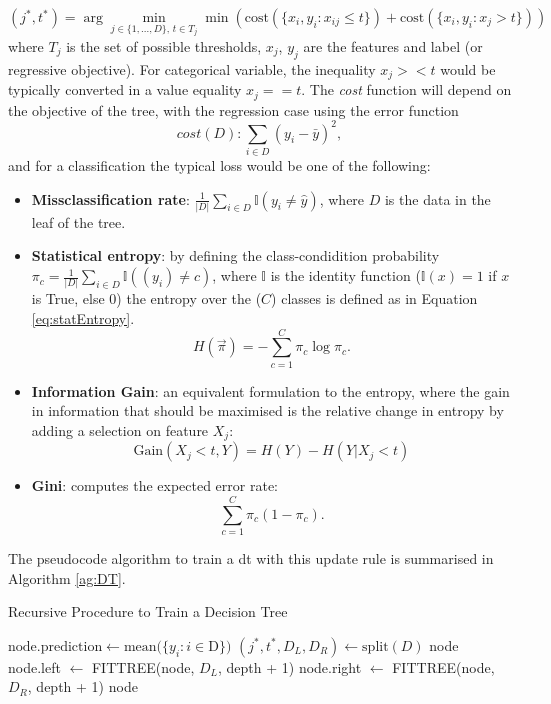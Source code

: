 \begin{equation}\label{eq:DTcost}
    (j^*, t^*) = \arg\min_{j\in \{1, ..., D\},\, t \in T_j} \min \left(\text{cost} (\{x_i, y_i : x_{ij} \leq t\}) + \text{cost}(\{x_i, y_i : x_j > t\}) \right)
\end{equation}
where $T_j$ is the set of possible thresholds, $x_j$, $y_j$ are the features and label (or regressive objective). For categorical variable, the inequality $x_j >< t$ would be typically converted in a value equality $x_j == t$. The \textit{cost} function will depend on the objective of the tree, with the regression case using the error function \[cost(D) : \sum_{i\in D}(y_i - \bar{y})^2,\] and for a classification the typical loss would be one of the following:
\begin{itemize}
    \item \textbf{Missclassification rate}: $\frac{1}{|D|} \sum_{i \in D} \mathbb{I}(y_i \neq \hat{y})$, where $D$ is the data in the leaf of the tree. 
    \item \textbf{Statistical entropy}: by defining the class-condidition probability $\pi_c = \frac{1}{|D|} \sum_{i \in D} \mathbb{I}((y_i) \neq c)$, where $\mathbb{I}$ is the identity function ($\mathbb{I}(x) = 1$ if $x$ is True, else $0$) the entropy over the ($C$) classes is defined as in Equation \ref{eq:statEntropy}. 
    \begin{equation}\label{eq:statEntropy}
        H(\vec{\pi}) = - \sum_{c=1}^C \pi_c \log \pi_c.
    \end{equation}
    \item \textbf{Information Gain}: an equivalent formulation to the entropy, where the gain in information that should be maximised is the relative change in entropy by adding a selection on feature $X_j$: 
    \[ \text{Gain}(X_j < t, Y) = H(Y) - H(Y | X_j < t) \]
    \item \textbf{Gini}: computes the expected error rate: \[\sum_{c=1}^C \pi_c (1 - \pi_c).\]
\end{itemize}


The pseudocode algorithm to train a \gls{dt} with this update rule is summarised in Algorithm \ref{ag:DT}. 

\begin{algorithm}
    \caption{Recursive Procedure to Train a Decision Tree \cite{MurphyML}}
    \begin{algorithmic}
        \State $\text{node.prediction} \gets \text{mean}(\{y_i : i \in $D$\})$ 
        \State $(j^*, t^*, D_L, D_R) \gets \text{split}(D)$
            \State \Return node
        \Else
            \State node.left $\gets$ FITTREE(node, $D_L$, depth + 1)
            \State node.right $\gets$ FITTREE(node, $D_R$, depth + 1)
            \State \Return node
        \EndIf
    \EndFunction
    \end{algorithmic}
    \label{ag:DT}
\end{algorithm}

